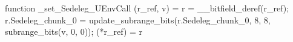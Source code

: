 function _set_Sedeleg_UEnvCall (r_ref, v) = {
    r = __bitfield_deref(r_ref);
    r.Sedeleg_chunk_0 = update_subrange_bits(r.Sedeleg_chunk_0, 8, 8, subrange_bits(v, 0, 0));
    (*r_ref) = r
}
